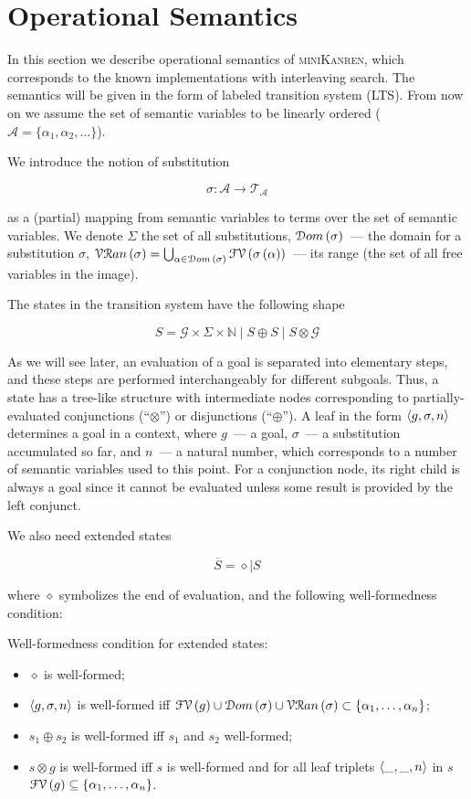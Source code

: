 \section{Operational Semantics}
\label{operational}

In this section we describe operational semantics of \textsc{miniKanren}, which corresponds to the known
implementations with interleaving search. The semantics will be given in the form of labeled transition system (LTS). From now on we
assume the set of semantic variables to be linearly ordered ($\mathcal{A}=\{\alpha_1,\alpha_2,\dots\}$).

We introduce the notion of substitution

\[
  \sigma : \mathcal{A}\to\mathcal{T_A}
\]

as a (partial) mapping from semantic variables to terms over the set of semantic variables. We denote $\Sigma$ the
set of all substitutions, $\mathcal{D}om\,({\sigma})$~--- the domain for a substitution $\sigma$,
$\mathcal{VR}an\,({\sigma})=\bigcup_{\alpha\in\mathcal{D}om\,(\sigma)}\mathcal{FV}\,({\sigma\,(\alpha)})$~--- its range (the set of all free variables in the image).

The states in the transition system have the following shape

\[
S = \mathcal{G}\times\Sigma\times\mathbb{N}\mid S\oplus S \mid S \otimes \mathcal{G}
\]

As we will see later, an evaluation of a goal is separated into elementary steps, and these steps are performed interchangeably for different subgoals. 
Thus, a state has a tree-like structure with intermediate nodes corresponding to partially-evaluated conjunctions (``$\otimes$'') or
disjunctions (``$\oplus$''). A leaf in the form $\left<{g, \sigma, n}\right>$ determines a goal in a context, where $g$~--- a goal, $\sigma$~--- a substitution accumulated so far,
and $n$~--- a natural number, which corresponds to a number of semantic variables used to this point. For a conjunction node, its right child is always a goal since
it cannot be evaluated unless some result is provided by the left conjunct.

We also need extended states

\[
\overline{S} = \diamond \mid S
\]

where $\diamond$ symbolizes the end of evaluation, and the following well-formedness condition:

\begin{definition}
  Well-formedness condition for extended states:
  
  \begin{itemize}
  \item $\diamond$ is well-formed;
  \item $\left<{g, \sigma, n}\right>$ is well-formed iff $\mathcal{FV}\,({g})\cup\mathcal{D}om\,({\sigma})\cup\mathcal{VR}an\,({\sigma})\subset\{\alpha_1,\dots,\alpha_n\}$;
  \item $s_1\oplus s_2$ is well-formed iff $s_1$ and $s_2$ well-formed;
  \item $s\otimes g$ is well-formed iff $s$ is well-formed and for all leaf triplets $\left<{\_,\_,n}\right>$ in $s$ $\mathcal{FV}\,({g})\subseteq\{\alpha_1,\dots,\alpha_n\}$.
  \end{itemize}
  
\end{definition}

